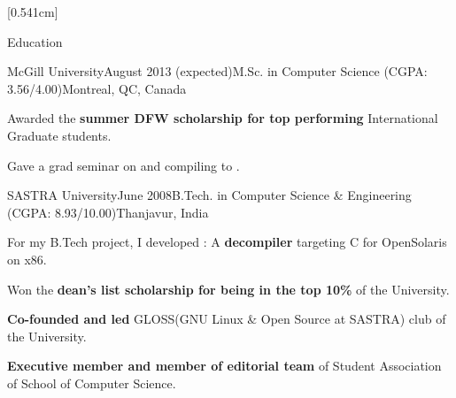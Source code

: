 \documentclass{resume} %
\begin{document}
[0.541cm]
 \begin{rSection}{Education}

\begin{rSubsection}{McGill University}{August 2013 (expected)}{M.Sc. in Computer Science (CGPA: 3.56/4.00)}{Montreal, QC, Canada}
\item Awarded the  \textbf{summer DFW scholarship for top performing} International Graduate students.
\item Gave a grad seminar on \xten and compiling \matlab to \xten.
\end{rSubsection}
\begin{rSubsection}{SASTRA University}{June 2008}{B.Tech. in Computer Science \& Engineering (CGPA: 8.93/10.00)}{Thanjavur, India}
\item For my B.Tech project, I developed \discode: A \textbf{decompiler} targeting C for OpenSolaris on x86.
\item Won the  \textbf{dean's list scholarship for being in the top 10\% }of the University. 
\item \textbf{Co-founded and led} GLOSS(GNU Linux \& Open Source at SASTRA) club of the University.
\item \textbf{Executive member and member of editorial team} of Student Association of School of Computer Science. 
\end{rSubsection}

\end{rSection}
\end{document}
